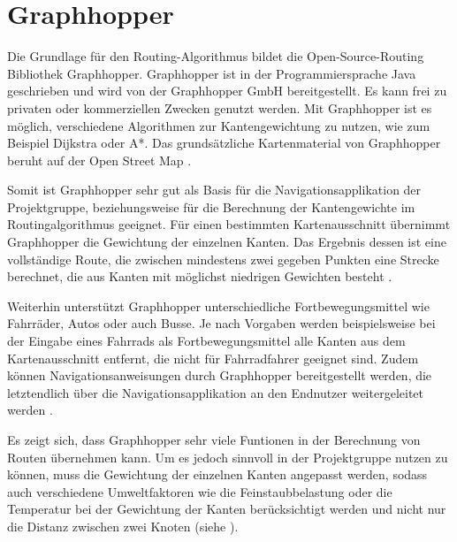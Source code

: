 \section{Graphhopper}
\label{sec:basics:routing:gh}
Die Grundlage für den Routing-Algorithmus bildet die Open-Source-Routing Bibliothek Graphhopper.
Graphhopper ist in der Programmiersprache Java geschrieben und wird von der Graphhopper GmbH bereitgestellt.
Es kann frei zu privaten oder kommerziellen Zwecken genutzt werden.
Mit Graphhopper ist es möglich, verschiedene Algorithmen zur Kantengewichtung zu nutzen, wie zum Beispiel Dijkstra oder A*.
Das grundsätzliche Kartenmaterial von Graphhopper beruht auf der Open Street Map\cite{OpenStreetMapGraphHopper} \cite{GraphHopperGithub}.

Somit ist Graphhopper sehr gut als Basis für die Navigationsapplikation der Projektgruppe, beziehungsweise für die Berechnung der Kantengewichte im Routingalgorithmus geeignet.
Für einen bestimmten Kartenausschnitt übernimmt Graphhopper die Gewichtung der einzelnen Kanten.
Das Ergebnis dessen ist eine vollständige Route, die zwischen mindestens zwei gegeben Punkten eine Strecke berechnet, die aus Kanten mit möglichst niedrigen Gewichten besteht \cite{GraphHopperGithub}.

Weiterhin unterstützt Graphhopper unterschiedliche Fortbewegungsmittel wie Fahrräder, Autos oder auch Busse.
Je nach Vorgaben werden beispielsweise bei der Eingabe eines Fahrrads als Fortbewegungsmittel alle Kanten aus dem Kartenausschnitt entfernt, die nicht für Fahrradfahrer geeignet sind.
Zudem können Navigationsanweisungen durch Graphhopper bereitgestellt werden, die letztendlich über die Navigationsapplikation an den Endnutzer weitergeleitet werden \cite{GraphHopperGithub}.


Es zeigt sich, dass Graphhopper sehr viele Funtionen in der Berechnung von Routen übernehmen kann.
Um es jedoch sinnvoll in der Projektgruppe nutzen zu können, muss die Gewichtung der einzelnen Kanten angepasst werden, sodass auch verschiedene Umweltfaktoren wie die Feinstaubbelastung oder die Temperatur bei der Gewichtung der Kanten berücksichtigt werden und nicht nur die Distanz zwischen zwei Knoten (siehe ).